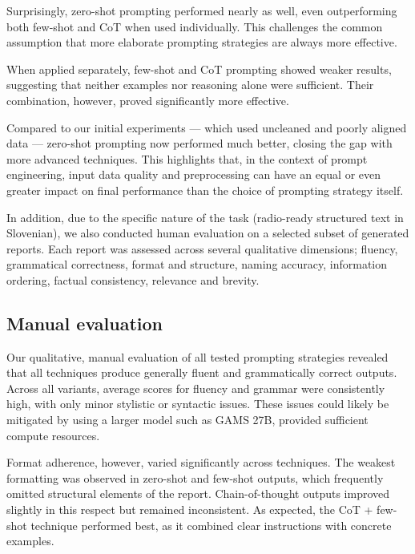 \documentclass[fleqn,moreauthors,10pt]{ds_report}
\begin{document}
Surprisingly, zero-shot prompting performed nearly as well, even outperforming both few-shot and CoT when used individually. This challenges the common assumption that more elaborate prompting strategies are always more effective.\newline

When applied separately, few-shot and CoT prompting showed weaker results, suggesting that neither examples nor reasoning alone were sufficient. Their combination, however, proved significantly more effective.\newline

Compared to our initial experiments — which used uncleaned and poorly aligned data — zero-shot prompting now performed much better, closing the gap with more advanced techniques. This highlights that, in the context of prompt engineering, input data quality and preprocessing can have an equal or even greater impact on final performance than the choice of prompting strategy itself.\newline

In addition, due to the specific nature of the task (radio-ready structured text in Slovenian), we also conducted human evaluation on a selected subset of generated reports. Each report was assessed across several qualitative dimensions; fluency, grammatical correctness, format and structure, naming accuracy, information ordering, factual consistency, relevance and brevity.\newline

\subsection*{Manual evaluation}
Our qualitative, manual evaluation of all tested prompting strategies revealed that all techniques produce generally fluent and grammatically correct outputs. Across all variants, average scores for fluency and grammar were consistently high, with only minor stylistic or syntactic issues. These issues could likely be mitigated by using a larger model such as GAMS 27B, provided sufficient compute resources.\newline

Format adherence, however, varied significantly across techniques. The weakest formatting was observed in zero-shot and few-shot outputs, which frequently omitted structural elements of the report. Chain-of-thought outputs improved slightly in this respect but remained inconsistent. As expected, the CoT + few-shot technique performed best, as it combined clear instructions with concrete examples.\newline
\end{document}
